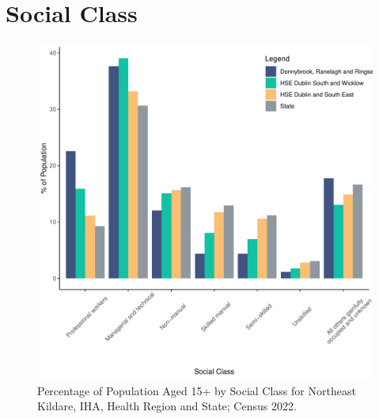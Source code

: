 \documentclass{article}
\begin{document}
\section{Social Class}\label{sect:SC}
\begin{figure}[H]
	\centering
	\includegraphics[width = 140mm]{../figures/SocialClassED.pdf}
	\caption{Percentage of Population Aged 15+ by Social Class for Northeast Kildare, IHA, Health Region and State; Census 2022.}
	\label{fig:vbnv}
	\end{figure}
\end{document}
